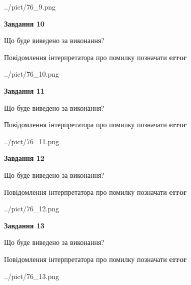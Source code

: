 \documentclass[11pt, ukrainian]{article}
\begin{document}
{\begin {large}
\begin{center}
	{../pict/76_9.png}
\end{center}
\newpage

{\begin {center}\textbf{Завдання 10}\end {center}}\par
Що буде виведено за виконання? \par
Повідомлення інтерпретатора про помилку позначати \textbf{error}

\begin{center}
	{../pict/76_10.png}
\end{center}
\newpage

{\begin {center}\textbf{Завдання 11}\end {center}}\par
Що буде виведено за виконання? \par
Повідомлення інтерпретатора про помилку позначати \textbf{error}

\begin{center}
	{../pict/76_11.png}
\end{center}
\newpage

{\begin {center}\textbf{Завдання 12}\end {center}}\par
Що буде виведено за виконання? \par
Повідомлення інтерпретатора про помилку позначати \textbf{error}

\begin{center}
	{../pict/76_12.png}
\end{center}
\newpage

{\begin {center}\textbf{Завдання 13}\end {center}}\par
Що буде виведено за виконання? \par
Повідомлення інтерпретатора про помилку позначати \textbf{error}

\begin{center}
	{../pict/76_13.png}
\end{center}
\newpage


\end{large}}
\end{document}
